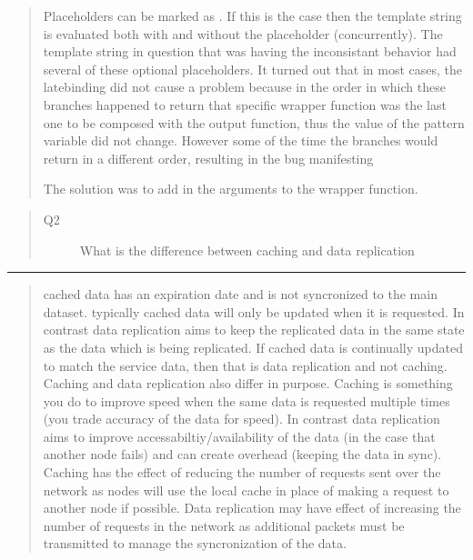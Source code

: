 \documentclass[letterpaper,10pt,english]{sphinxmanual}
\begin{document}
\begin{quote}
Placeholders can be marked as . If this is the case then the template string
is evaluated both with and without the placeholder (concurrently).
The template string in question
that was having the inconsistant behavior had several of these optional placeholders.
It turned out that in most cases, the late\sphinxhyphen{}binding did not cause a problem because in
the order in which these branches happened to return that specific wrapper
function was the last one to be composed with the output function,
thus the value of the pattern variable did not change. However some of the time the
branches would return in a different order, resulting in the bug manifesting

The solution was to add  in the arguments to the wrapper function.
\end{quote}
\begin{quote}\begin{description}
\item[{Q2}] \leavevmode
What is the difference between caching and data replication

\end{description}\end{quote}


\bigskip\hrule\bigskip

\begin{quote}

cached data has an expiration date and is not syncronized to the main dataset.
typically cached data will only be updated when it is requested. In contrast
data replication aims to keep the replicated data in the same state as the
data which is being replicated. If cached data is continually updated to match
the service data, then that is data replication and not caching. Caching and data
replication also differ in purpose. Caching is something you do to improve speed when
the same data is requested multiple times (you trade accuracy of the data for speed).
In contrast data replication aims to improve accessabiltiy/availability of the data
(in the case that another node fails) and can create overhead (keeping the data in
sync). Caching has the effect of reducing the number of requests sent over the network
as nodes will use the local cache in place of making a request to another node if
possible. Data replication may have effect of increasing the number of requests in the
network as additional packets must be transmitted to manage the syncronization
of the data.
\end{quote}
\end{document}
